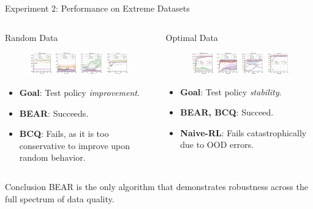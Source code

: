 \documentclass[11pt]{beamer}
\newcommand{\tb}[1]{\textbf{#1}}
\begin{document}
\begin{frame}{Experiment 2: Performance on Extreme Datasets}
    \begin{columns}[T]
        \begin{column}{.5\textwidth}
            \begin{block}{Random Data}
                \begin{figure}
                \includegraphics[width=\textwidth]{Figure5Top.png}
                \end{figure}
                \begin{itemize}
                    \item \tb{Goal}: Test policy \textit{improvement}.
                    \item \tb{BEAR}: Succeeds.
                    \item \tb{BCQ}: Fails, as it is too conservative to improve upon random behavior.
                \end{itemize}
            \end{block}
        \end{column}
        \begin{column}{.5\textwidth}
            \begin{block}{Optimal Data}
                \begin{figure}
                \includegraphics[width=\textwidth]{Figure5Bottom.png}
                \end{figure}
                \begin{itemize}
                    \item \tb{Goal}: Test policy \textit{stability}.
                    \item \tb{BEAR, BCQ}: Succeed.
                    \item \tb{Naive-RL}: Fails catastrophically due to OOD errors.
                \end{itemize}
            \end{block}
        \end{column}
    \end{columns}
    
    \begin{block}{Conclusion}
        BEAR is the only algorithm that demonstrates robustness across the full spectrum of data quality.
    \end{block}
\end{frame}
\end{document}
